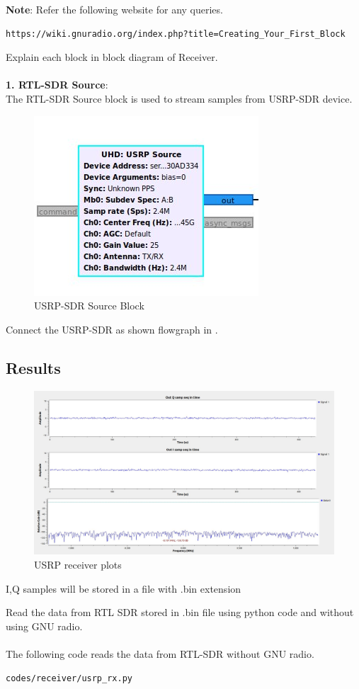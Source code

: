 \textbf{Note}:
Refer the following website for any queries.
\begin{lstlisting}
https://wiki.gnuradio.org/index.php?title=Creating_Your_First_Block
\end{lstlisting}
 Explain each block in block diagram of Receiver.\\
	\solution \\
\textbf{1. RTL-SDR Source}:\\
The RTL-SDR Source block is used to stream samples from USRP-SDR device.
\begin{figure}[H]
\centering
\includegraphics[width=0.4\columnwidth]{figs/usrp-sink.jpg}
\caption{USRP-SDR Source Block}
\label{fig:source block_USRP}
\end{figure}
Connect the USRP-SDR as shown flowgraph in .\\



\subsection{Results} 
\begin{figure}
\includegraphics[width=0.8\columnwidth]{figs/USRP_results.jpg}
\caption{USRP receiver plots}
\label{fig:plots}
\end{figure}

I,Q samples will be stored in a file with .bin extension

Read the data from RTL SDR stored in .bin file using python code and without using GNU radio.
\\
\solution \\
The following code reads the data from RTL-SDR without GNU radio.
\begin{lstlisting}
codes/receiver/usrp_rx.py
\end{lstlisting}
















